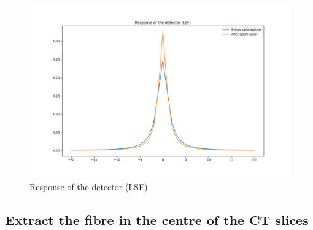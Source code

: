 \documentclass[11pt]{article}
\begin{document}
    \begin{figure}
\centering
\includegraphics{plots/LSF_optimised.png}
\caption{Response of the detector (LSF)}
\end{figure}

\hypertarget{extract-the-fibre-in-the-centre-of-the-ct-slices}{%
\subsection{Extract the fibre in the centre of the CT
slices}\label{extract-the-fibre-in-the-centre-of-the-ct-slices}}
\end{document}
